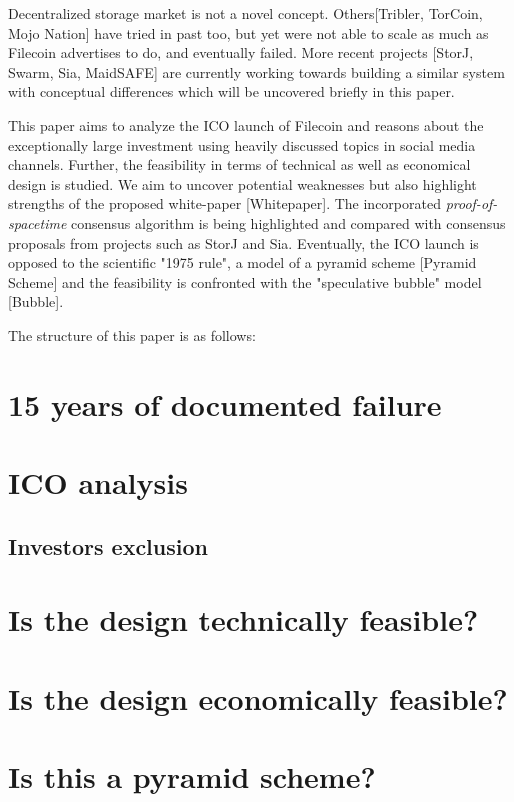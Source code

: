 \documentclass[journal]{IEEEtran}
\begin{document}
Decentralized storage market is not a novel concept.
Others[Tribler, TorCoin, Mojo Nation] have tried in past too, but yet were not able to scale as much as Filecoin advertises to do, and eventually failed.
More recent projects [StorJ, Swarm, Sia, MaidSAFE] are currently working towards building a similar system with conceptual differences which will be uncovered briefly in this paper.

This paper aims to analyze the ICO launch of Filecoin and reasons about the exceptionally large investment using heavily discussed topics in social media channels.
Further, the feasibility in terms of technical as well as economical design is studied.
We aim to uncover potential weaknesses but also highlight strengths of the proposed white-paper [Whitepaper].
The incorporated \textit{proof-of-spacetime} consensus algorithm is being highlighted and compared with consensus proposals from projects such as StorJ and Sia.
Eventually, the ICO launch is opposed to the scientific "1975 rule", a model of a pyramid scheme [Pyramid Scheme] and the feasibility is confronted with the "speculative bubble" model [Bubble].

The structure of this paper is as follows:

\section{15 years of documented failure}

\section{ICO analysis}

\subsection{Investors exclusion}

\section{Is the design technically feasible?}

\section{Is the design economically feasible?}

\section{Is this a pyramid scheme?}
\end{document}
